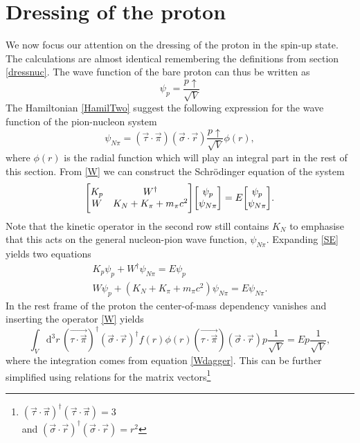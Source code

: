 \section{Dressing of the proton} 
We now focus our attention on the dressing of the proton in the spin-up state. The calculations are almost identical remembering the definitions from section \ref{dressnuc}. The wave function of the bare proton can thus be written as
\begin{equation} \label{bareproton}
	\psi_p = \frac{p\uparrow}{\sqrt{V}}
\end{equation}
The Hamiltonian \eqref{HamilTwo} suggest the following expression for the wave function of the pion-nucleon system
\begin{equation} \label{pionnuc}
	\psi_{N\pi} = (\vec{\tau}\cdot\vec{\pi})(\vec{\sigma}\cdot\vec{r})\frac{p \uparrow}{\sqrt{V}}\phi(r),
\end{equation}
where $\phi(r)$ is the radial function which will play an integral part in the rest of this section.
From \eqref{W} we can construct the Schrödinger equation of the system
\begin{equation}\label{SE}
	\mqty[K_{p} & W^\dagger \\ W & K_{N}+K_{\pi}+m_\pi c^2]\mqty[\psi_p \\ \psi_{N\pi}] = E \mqty[\psi_p \\ \psi_{N\pi}].
\end{equation}
Note that the kinetic operator in the second row still contains $K_N$ to emphasise that this acts on the general nucleon-pion wave function, $\psi_{N\pi}$. Expanding \eqref{SE} yields two equations
\begin{align}
	K_{p}\psi_p + W^\dagger \psi_{N\pi} = E\psi_p \label{SE1} \\
	W\psi_p + (K_{N}+K_{\pi}+m_\pi c^2)\psi_{N\pi} = E\psi_{N\pi} \label{SE2}.
\end{align}
In the rest frame of the proton the center-of-mass dependency vanishes and inserting the operator \eqref{W} yields
\begin{equation}
	\int_V \text{d}^3r \, (\vec{\tau\cdot\vec{\pi}})^\dagger(\vec{\sigma}\cdot\vec{r})^\dagger f(r)\phi(r)(\vec{\tau\cdot\vec{\pi}})(\vec{\sigma}\cdot\vec{r})p\frac{1}{\sqrt{V}} = E p\frac{1}{\sqrt{V}},
\end{equation}
where the integration comes from equation \eqref{Wdagger}. This can be further simplified using relations for the matrix vectors\footnote{$(\vec{\tau}\cdot \vec{\pi})^\dagger(\vec{\tau}\cdot \vec{\pi}) = 3$ \\ and
	$(\vec{\sigma}\cdot \vec{r})^\dagger(\vec{\sigma}\cdot \vec{r}) = r^2$}
